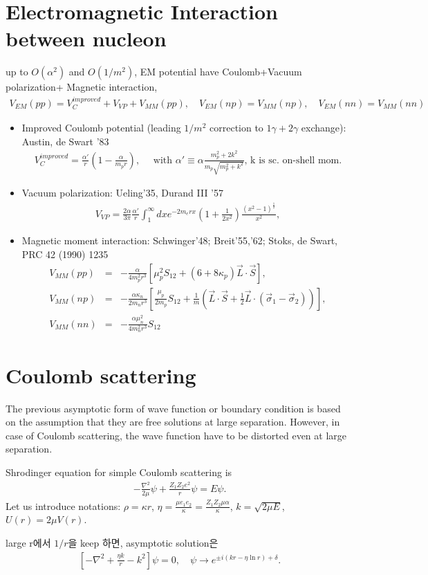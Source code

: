 \documentclass[10pt]{article}
\newcommand{\bea}{\begin{eqnarray}}
\newcommand{\eea}{\end{eqnarray}}
\newcommand{\no}{\nonumber \\}
\begin{document}
\section{Electromagnetic Interaction between nucleon}
up to $O(\alpha^2)$ and $O(1/m^2)$,
EM potential have Coulomb+Vacuum polarization+ Magnetic interaction,
\bea
V_{EM}(pp)=V_C^{improved}+V_{VP}+V_{MM}(pp),
\quad
V_{EM}(np)=V_{MM}(np),\quad
V_{EM}(nn)=V_{MM}(nn)
\eea
\begin{itemize}
\item Improved Coulomb potential
(leading $1/m^2$ correction to $1\gamma+2\gamma$ exchange):
Austin, de Swart ’83
\bea
V_C^{improved}=\frac{\alpha'}{r}\left(1-\frac{\alpha}{m_p r}\right),
\quad \mbox{ with } 
\alpha'\equiv \alpha\frac{m_p^2+2k^2}{m_p\sqrt{m_p^2+k^2}}
\mbox{,  k is sc. on-shell mom.}
\eea
\item Vacuum polarization: Ueling’35, Durand III ’57
\bea
V_{VP}=\frac{2\alpha}{3\pi}\frac{\alpha'}{r}
       \int_1^\infty dx e^{-2 m_e r x}\left(1+\frac{1}{2x^2}\right)
       \frac{(x^2-1)^{\frac{1}{2}}}{x^2},
\eea
\item Magnetic moment interaction:
Schwinger’48; Breit’55,’62; Stoks, de Swart, PRC 42 (1990) 1235
\bea
V_{MM}(pp)&=& -\frac{\alpha}{4 m_p^2 r^3}
      \left[\mu_p^2 S_{12}+(6+8\kappa_p){\vec L}\cdot{\vec S}\right],\no
V_{MM}(np)&=&-\frac{\alpha\kappa_n}{2 m_n r^3}
      \left[\frac{\mu_p}{2m_p}S_{12}+\frac{1}{m}
      \left({\vec L}\cdot{\vec S}+\frac{1}{2}{\vec L}\cdot(\vec{\sigma}_1-\vec{\sigma}_2)\right)
      \right]              ,\no
V_{MM}(nn)&=&-\frac{\alpha\mu_n^2}{4m_n^2 r^3} S_{12}      
\eea
\end{itemize}

\section{Coulomb scattering}
The previous asymptotic form of wave function or boundary condition
is based on the assumption that they are free solutions at large separation. 
However, in case of Coulomb scattering, 
the wave function have to be distorted even at large separation.

Shrodinger equation for simple Coulomb scattering is
\bea
-\frac{\nabla^2}{2\mu}\psi+\frac{Z_1 Z_2 e^2}{r}\psi=E\psi.
\eea
Let us introduce notations:
$\rho=\kappa r$, 
$\eta=\frac{\mu e_1 e_2}{\kappa}=\frac{Z_1 Z_2 \mu\alpha}{\kappa}$,
$k=\sqrt{2\mu E}$, $U(r)=2\mu V(r)$.

large r에서 $1/r$을 keep 하면, asymptotic solution은 
\bea
\left[-\nabla^2+\frac{\eta k}{r}-k^2\right]\psi=0,
\quad \psi\to e^{\pm i (kr-\eta \ln r)+\delta}.
\eea
\end{document}
